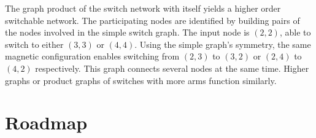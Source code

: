 \begin{center}
\end{center}

\noindent The graph product of the switch network with itself yields a higher order switchable network. The participating nodes are identified by building pairs of the nodes involved in the simple switch graph. The input node is $(2,2)$, able to switch to either $(3,3)$ or $(4,4)$. Using the simple graph's symmetry, the same magnetic configuration enables switching from $(2,3)$ to $(3,2)$ or $(2,4)$ to $(4,2)$ respectively. This graph connects several nodes at the same time. Higher graphs or product graphs of switches with more arms function similarly.

\section{Roadmap}
